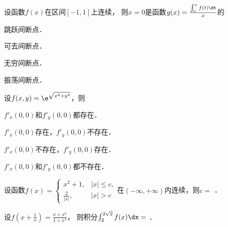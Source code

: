 \documentclass[plain,noanswer,medmath]{../../template/jnuexam}
\begin{document}






\begin{problem}
设函数$f(x)$在区间$[-1,1]$上连续，
则$x = 0$是函数$g(x) = \frac{\int_0^x f(t)\dt}{x}$的\pickout{}
\begin{abcd}
\item 跳跃间断点．
\item 可去间断点．
\item 无穷间断点．
\item 振荡间断点．
\end{abcd}
\end{problem}




\begin{problem}
设$f(x,y) = \e^{\sqrt{x^2 + y^4}}$，则\pickout{}
\begin{abcd}
\item $f'_x(0,0)$和$f'_y(0,0)$都存在．
\item $f'_x(0,0)$存在，$f'_y(0,0)$不存在．
\item $f'_x(0,0)$不存在，$f'_y(0,0)$存在．
\item $f'_x(0,0)$和$f'_y(0,0)$都不存在．
\end{abcd}
\end{problem}














\begin{problem}
设函数$f(x) = \begin{cases}
        x^2 + 1, & |x| \le c, \\
  \frac{2}{|x|}, & |x| > c
\end{cases}$在$(-\infty , +\infty)$内连续，则$c =$ \fillin{}．
\end{problem}


\begin{problem}
设$f\left(x + \frac{1}{x} \right) = \frac{x + x^3}{1 + x^4}$，
则积分$\int_2^{2\sqrt{2}} f (x)\dx =$ \fillin{}．
\end{problem}
\end{document}
